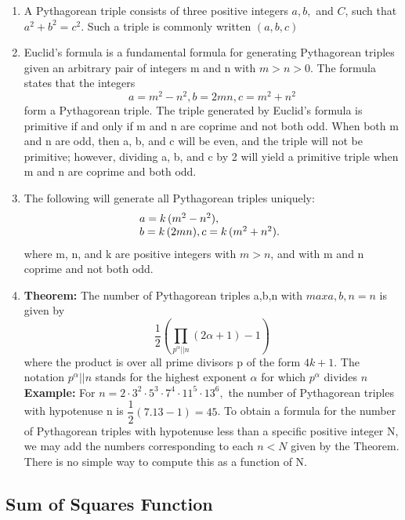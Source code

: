 \begin{enumerate}[resume]
    \item A Pythagorean triple consists of three positive integers $\displaystyle a, b,$ and $\displaystyle C$, such that $\displaystyle a^{2}+b^{2}=c^{2}$. Such a triple is commonly written $\displaystyle (a, b, c)$
    \item Euclid’s formula is a fundamental formula for generating Pythagorean triples given an arbitrary pair of integers m and n with $m >n >0$. The formula states that the integers
    \[\displaystyle a = m^{2}-n^{2}, b = 2mn,  c = m^{2}+n^{2}\]
    form a Pythagorean triple. The triple generated by Euclid’s formula is primitive if and only if m and n are coprime and not both odd. When both m and n are odd, then a, b, and c will be even, and the triple will not be primitive; however, dividing a, b, and c by 2 will yield a primitive triple when m and n are coprime and both odd.
    \item The following will generate all Pythagorean triples uniquely:
  \[
\begin{array}{@{}l}
a = k\,(m^{2} - n^{2}), \\
b = k\,(2mn),
c = k\,(m^{2} + n^{2}).
\end{array}
\]
    where m, n, and k are positive integers with $m > n$, and with m and n coprime and not both odd.
    \item \textbf{Theorem:}
    The number of Pythagorean triples
    {a,b,n} with $max{a,b,n} = n$ is given by
    \[\displaystyle \dfrac{1}{2}\left( \displaystyle\prod _{ p^{\alpha} || n}\left( 2\alpha +1\right) -1\right)\]
    where the product is over all prime divisors p of the form $4k+1$.
    The notation $\displaystyle p^{\alpha} || n$ stands for the highest exponent $\displaystyle \alpha$ for which $\displaystyle p^{\alpha}$ divides $n$
    \textbf{Example:}
    For $n = 2\cdot3^{2}\cdot5^{3}\cdot7^{4}\cdot11^{5}\cdot13^{6},$ the number of Pythagorean triples with hypotenuse n is $\displaystyle \dfrac{1}{2}\left( 7.13-1\right) =45$.
    To obtain a formula for the number of Pythagorean triples with hypotenuse less than a specific positive integer N, we may add the numbers corresponding to each $n < N$ given by the Theorem. There is no simple way to compute this as a function of N.
\end{enumerate}

\subsection{Sum of Squares Function}

